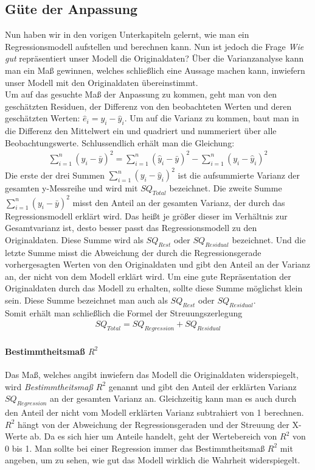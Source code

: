 \documentclass[a4paper]{article}
\begin{document}
\subsection{Güte der Anpassung}
Nun haben wir in den vorigen Unterkapiteln gelernt, wie man ein Regressionsmodell aufstellen und berechnen kann. Nun ist jedoch die Frage \textit{Wie gut} repräsentiert unser Modell die Originaldaten? Über die Varianzanalyse kann man ein Maß gewinnen, welches schließlich eine Aussage machen kann, inwiefern unser Modell mit den Originaldaten übereinstimmt. \\
Um auf das gesuchte Maß der Anpassung zu kommen, geht man von den geschätzten Residuen, der Differenz von den beobachteten Werten und deren geschätzten Werten: $\hat{e}_i=y_i-\hat{y}_i$. Um auf die Varianz zu kommen, baut man in die Differenz den Mittelwert ein und quadriert und nummeriert über alle Beobachtungswerte. Schlussendlich erhält man die Gleichung:
\begin{align*}
    \sum_{i=1}^n(y_i-\bar{y})^2=\sum_{i=1}^n(\hat{y}_i-\bar{y})^2-\sum_{i=1}^n(y_i-\hat{y}_i)^2
\end{align*}
Die erste der drei Summen $\sum_{i=1}^n(y_i-\hat{y}_i)^2$ ist die aufsummierte Varianz der gesamten y-Messreihe und wird mit $SQ_{Total}$ bezeichnet. Die zweite Summe $\sum_{i=1}^n(y_i-\bar{y})^2$ misst den Anteil an der gesamten Varianz, der durch das Regressionsmodell erklärt wird. Das heißt je größer dieser im Verhältnis zur Gesamtvarianz ist, desto besser passt das Regressionsmodell zu den Originaldaten. Diese Summe wird als $SQ_{Rest}$ oder $SQ_{Residual}$ bezeichnet. Und die letzte Summe misst die Abweichung der durch die Regressionsgerade vorhergesagten Werten von den Originaldaten und gibt den Anteil an der Varianz an, der nicht von dem Modell erklärt wird. Um eine gute Repräsentation der Originaldaten durch das Modell zu erhalten, sollte diese Summe möglichst klein sein. Diese Summe bezeichnet man auch als $SQ_{Rest}$ oder $SQ_{Residual}$.\\
Somit erhält man schließlich die Formel der Streuungszerlegung \begin{align*}
    SQ_{Total}=SQ_{Regression}+SQ_{Residual}
\end{align*}
\paragraph{Bestimmtheitsmaß $R^2$}Das Maß, welches angibt inwiefern das Modell die Originaldaten widerspiegelt, wird \textit{Bestimmtheitsmaß $R^2$} genannt und gibt den Anteil der erklärten Varianz $SQ_{Regression}$ an der gesamten Varianz an. Gleichzeitig kann man es auch durch den Anteil der nicht vom Modell erklärten Varianz subtrahiert von 1 berechnen.$R^2$ hängt von der Abweichung der Regressionsgeraden und der Streuung der X-Werte ab.
Da es sich hier um Anteile handelt, geht der Wertebereich von $R^2$ von 0 bis 1.
Man sollte bei einer Regression immer das Bestimmtheitsmaß $R^2$ mit angeben, um zu sehen, wie gut das Modell wirklich die Wahrheit widerspiegelt. 
\end{document}
